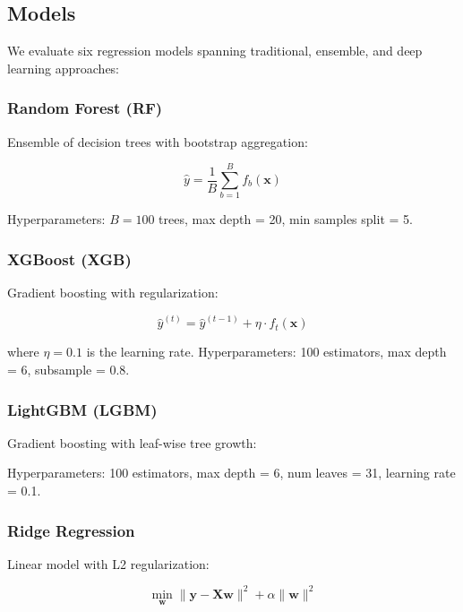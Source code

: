 \documentclass[11pt,a4paper]{article}
\begin{document}
\subsection{Models}

We evaluate six regression models spanning traditional, ensemble, and deep learning approaches:

\subsubsection{Random Forest (RF)}

Ensemble of decision trees with bootstrap aggregation:

\begin{equation}
\hat{y} = \frac{1}{B}\sum_{b=1}^{B} f_b(\mathbf{x})
\end{equation}

Hyperparameters: $B=100$ trees, max depth = 20, min samples split = 5.

\subsubsection{XGBoost (XGB)}

Gradient boosting with regularization:

\begin{equation}
\hat{y}^{(t)} = \hat{y}^{(t-1)} + \eta \cdot f_t(\mathbf{x})
\end{equation}

where $\eta = 0.1$ is the learning rate. Hyperparameters: 100 estimators, max depth = 6, subsample = 0.8.

\subsubsection{LightGBM (LGBM)}

Gradient boosting with leaf-wise tree growth:

Hyperparameters: 100 estimators, max depth = 6, num leaves = 31, learning rate = 0.1.

\subsubsection{Ridge Regression}

Linear model with L2 regularization:

\begin{equation}
\min_{\mathbf{w}} \|\mathbf{y} - \mathbf{Xw}\|^2 + \alpha\|\mathbf{w}\|^2
\end{equation}
\end{document}
